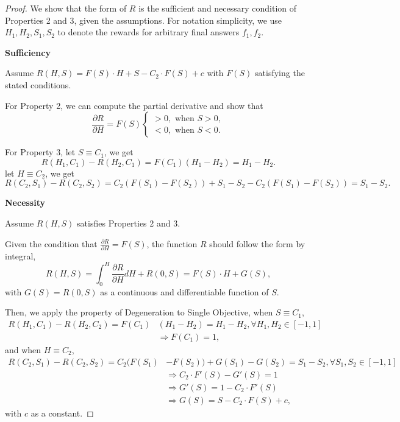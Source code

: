 \begin{proof} We show that the form of $R$ is the sufficient and necessary condition of Properties 2 and 3, given the assumptions. For notation simplicity, we use $H_1,H_2,S_1,S_2$ to denote the rewards for arbitrary final answers $f_1, f_2$.

\textbf{Sufficiency}

Assume $R(H,S)=F(S)\cdot H+S-C_2\cdot F(S)+c$ with $F(S)$ satisfying the stated conditions.

For Property 2, we can compute the partial derivative and show that
\begin{equation*}
    \frac{\partial R}{\partial H} = F(S) \begin{cases}
        > 0,\text{ when }S>0,\\
        <0,\text{ when }S<0.
    \end{cases}
\end{equation*}

For Property 3, let $S\equiv C_1$, we get
\begin{equation*}
    R(H_1,C_1)-R(H_2,C_1) = F(C_1) (H_1-H_2) = H_1-H_2.
\end{equation*}
let $H\equiv C_2$, we get
\begin{equation*}
    R(C_2,S_1)-R(C_2,S_2) = C_2(F(S_1)-F(S_2)) + S_1-S_2 -C_2(F(S_1)-F(S_2))= S_1-S_2.
\end{equation*}

\textbf{Necessity}

    Assume $R(H,S)$ satisfies Properties 2 and 3.

    Given the condition that $\frac{\partial R}{\partial H} = F(S)$, the function $R$ should follow the form by integral, 
    \begin{equation}
        R(H,S) = \int_0^H \frac{\partial R}{\partial H}dH+R(0,S) =F(S)\cdot H + G(S),
        \label{eq:reward}
    \end{equation}
    with $G(S)=R(0,S)$ as a continuous and differentiable function of $S$.

    Then, we apply the property of Degeneration to Single Objective, when $S\equiv C_1$,
    \begin{align*}
        R(H_1, C_1)-R(H_2,C_2) = F(C_1)& (H_1-H_2) = H_1-H_2, \forall H_1,H_2\in[-1,1]\\
        &\Rightarrow F(C_1) = 1,
    \end{align*}
    and when $H\equiv C_2$, 
    \begin{align*}
        R(C_2, S_1) - R(C_2, S_2) = C_2(F(S_1)& - F(S_2)) + G(S_1) - G(S_2) = S_1 - S_2, \forall S_1, S_2 \in[-1,1]\\ 
        &\Rightarrow C_2\cdot F'(S) - G'(S) = 1\\ 
        &\Rightarrow G'(S) = 1- C_2\cdot F'(S)\\ 
        &\Rightarrow G(S) = S-C_2\cdot F(S) + c, 
    \end{align*}
    with $c$ as a constant.


\end{proof}
